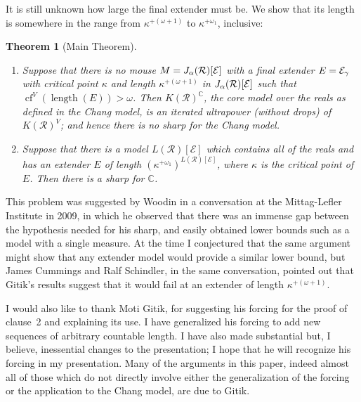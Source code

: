 \documentclass[
twoside,
]{article}
\newtheorem{theorem}{Theorem}[section]
\theoremstyle{definition}
\theoremstyle{remark}
\newcommand\reals{\mathcal{R}}
\DeclareMathOperator{\len}{length}
\DeclareMathOperator{\cof}{cf}
\newcommand\chang{\mathbb{C}}
\begin{document}
It is still unknown  how large the  final extender must be.   We show
that its length is somewhere in the range from $\kappa^{+(\omega+1)}$
to $\kappa^{+\omega_1}$, inclusive:
\begin{theorem}[Main Theorem]
  \label{thm:main}
  \begin{enumerate}
  \item\label{item:main-lower} Suppose that there is no mouse
    $M=J_{\alpha}(\reals)[{\cal E}]$ with a final extender $E={\cal
      E}_{\gamma}$ with critical point $\kappa$ and length $\kappa^{+(\omega+1)}$ in $J_{\alpha}(\reals)[{\cal E}]$ such that  $\cof^V(\len(E))>\omega$.
    Then $K(\reals)^{\chang}$, 
    the core model  over the reals as defined in
    the Chang model, is an iterated ultrapower (without drops) of
    $K(\reals)^{V}$; and hence there is no sharp for the
    Chang model.

  \item\label{item:main-upper}
    Suppose that there is a model $L(\reals)[\mathcal{E}]$ which
    contains all of the reals  and has an extender $E$ of length
    $(\kappa^{+\omega_1})^{L(\reals)[\mathcal{E}]}$, where $\kappa$ is the critical point of $E$.
    Then
    there is a sharp for     $\chang$.
  \end{enumerate}
\end{theorem}

This problem was suggested by Woodin in a conversation at the
Mittag-Lefler Institute in 2009, in which he observed that there
was an immense  gap between the hypothesis needed for his sharp, and
easily obtained 
lower bounds such as a model with a single measure.
At the time I conjectured that the same argument might show that any
extender model would provide a similar lower bound,  but James
Cummings and Ralf Schindler, in the same conversation, 
pointed out that  Gitik's results suggest that it would fail at  an
extender of length $\kappa^{+(\omega+1)}$.

I would also like to thank Moti Gitik, for suggesting his
forcing for the proof of clause~2 and
explaining its use.    
I have generalized his forcing to add new sequences of arbitrary
countable length.   I have also made substantial but, I believe,
inessential changes to the presentation; I hope that he will recognize
his forcing in my presentation.    Many of the arguments in this
paper, indeed almost all of those which do not directly involve either the
generalization of the forcing or the application to the Chang model,
are due to Gitik.
\end{document}
